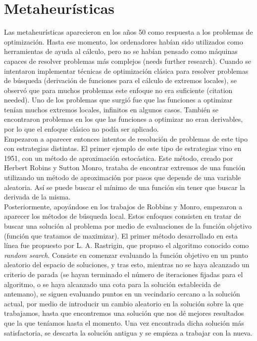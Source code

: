 \documentclass[12pt]{article} \usepackage[utf8x]{inputenc}
\begin{document}
\section{Metaheurísticas}

Las metaheurísticas aparecieron en los años 50 como respuesta a los
problemas de optimización. Hasta ese momento, los ordenadores habían
sido utilizados como herramientas de ayuda al cálculo, pero no se
habían pensado como máquinas capaces de resolver problemas más
complejos (needs further research). Cuando se intentaron implementar
técnicas de optimización clásica para resolver problemas de búsqueda
(derivación de funciones para el cálculo de extremos locales), se
observó que para muchos problemas este enfoque no era suficiente
(citation needed). Uno de los problemas que surgió fue que las
funciones a optimizar tenían muchos extremos locales, infinitos en
algunos casos. También se encontraron problemas en los que las
funciones a optimizar no eran derivables, por lo que el enfoque
clásico no podía
ser aplicado.\\

Empezaron a aparecer entonces intentos de resolución de problemas de
este tipo con estrategias distintas. El primer ejemplo de este tipo de
estrategias vino en 1951, con un método de aproximación estocástica.
Este método, creado por Herbert Robins y Sutton Monro, trataba de
encontrar extremos de una función utilizando un método de aproximación
por pasos que depende de una variable aleatoria. Así se puede buscar
el mínimo de una función sin tener que buscar la derivada de la misma.\\

Posteriormente, apoyándose en los trabajos de Robbins y Monro,
empezaron a aparecer los métodos de búsqueda local. Estos enfoques
consisten en tratar de buscar una solución al problema por medio de
evaluaciones de la función objetivo (función que tratamos de
maximizar). El primer método desarrollado en esta línea fue propuesto
por L. A. Rastrigin, que propuso el algoritmo conocido como
\textit{random search}. Consiste en comenzar evaluando la función
objetivo en un punto aleatorio del espacio de soluciones, y tras esto,
mientras no se haya alcanzado un criterio de parada (se hayan
terminado el número de iteraciones fijadas para el algoritmo, o se
haya alcanzado una cota para la solución establecida de antemano), se
siguen evaluando puntos en un vecindario cercano a la solución actual,
por medio de introducir un cambio aleatorio en la solución sobre la
que trabajamos, hasta que encontremos una solución que nos dé mejores
resultados que la que teníamos hasta el momento. Una vez encontrada
dicha solución más satisfactoria, se descarta la solución antigua
y se empieza a trabajar con la nueva.\\
\end{document}
